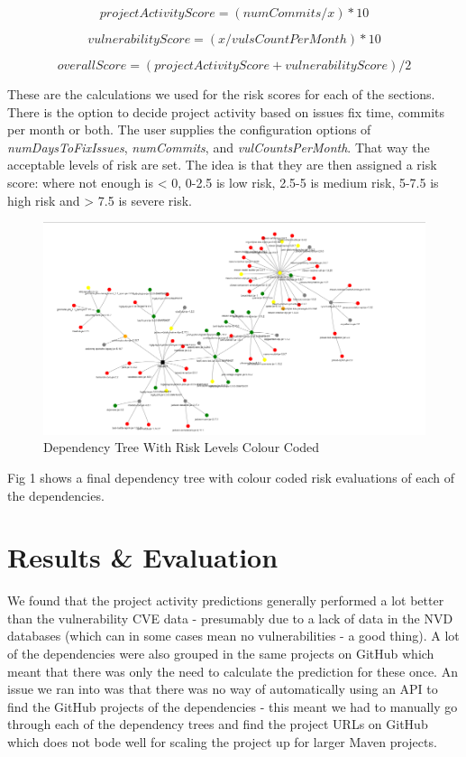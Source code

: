 \documentclass[10pt, onecolumn]{IEEEtran}
\begin{document}
\[ projectActivityScore = ( numCommits / x ) * 10\]

\[vulnerabilityScore = ( x / vulsCountPerMonth ) * 10\]

\[overallScore = ( projectActivityScore + vulnerabilityScore) / 2\]


These are the calculations we used for the risk scores for each of the sections. There is the option to decide project activity based on issues fix time, commits per month or both. The user supplies the configuration options of \textit{numDaysToFixIssues}, \textit{numCommits}, and \textit{vulCountsPerMonth}. That way the acceptable levels of risk are set. The idea is that they are then assigned a risk score: where not enough is < 0, 0-2.5 is low risk, 2.5-5 is medium risk, 5-7.5 is high risk and > 7.5 is severe risk. 

\begin{figure}
    \centering
    \includegraphics[width=01\linewidth]{image.png}
    \caption{Dependency Tree With Risk Levels Colour Coded} 
\end{figure}

Fig 1 shows a final dependency tree with colour coded risk evaluations of each of the dependencies.


\section{Results \& Evaluation}
We found that the project activity predictions generally performed a lot better than the vulnerability CVE data - presumably due to a lack of data in the NVD databases (which can in some cases mean no vulnerabilities - a good thing). A lot of the dependencies were also grouped in the same projects on GitHub which meant that there was only the need to calculate the prediction for these once. An issue we ran into was that there was no way of automatically using an API to find the GitHub projects of the dependencies - this meant we had to manually go through each of the dependency trees and find the project URLs on GitHub which does not bode well for scaling the project up for larger Maven projects. 
\end{document}
